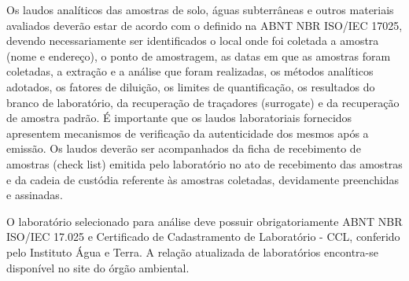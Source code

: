 Os laudos analíticos das amostras de solo, águas 
subterrâneas e outros materiais avaliados deverão estar de 
acordo com o definido na ABNT NBR ISO/IEC 17025, devendo 
necessariamente ser identificados o local onde foi coletada 
a amostra (nome e endereço), o ponto de amostragem, as 
datas em que as amostras foram coletadas, a extração e a 
análise que foram realizadas, os métodos analíticos 
adotados, os fatores de diluição, os limites de 
quantificação, os resultados do branco de laboratório, da 
recuperação de traçadores (surrogate) e da recuperação de 
amostra padrão. É importante que os laudos laboratoriais 
fornecidos apresentem mecanismos de verificação da 
autenticidade dos mesmos após a emissão. Os laudos deverão 
ser acompanhados da ficha de recebimento de amostras (check 
list) emitida pelo laboratório no ato de recebimento das 
amostras e da cadeia de custódia referente às amostras 
coletadas, devidamente preenchidas e assinadas.

O laboratório selecionado para análise deve possuir 
obrigatoriamente ABNT NBR ISO/IEC 17.025 e Certificado de 
Cadastramento de Laboratório - CCL, conferido pelo 
Instituto Água e Terra. A relação atualizada de 
laboratórios encontra-se disponível no site do órgão 
ambiental.

